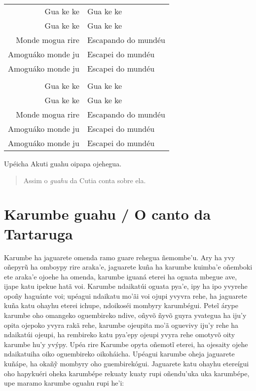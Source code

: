 \begin{itemize}
\begin{table}[]
\begin{tabular}{rl}
Gua ke ke         & Gua ke ke           \\
Gua ke ke         & Gua ke ke           \\
Monde mogua rire  & Escapando do mundéu \\
Amoguáko monde ju & Escapei do mundéu   \\
Amoguáko monde ju & Escapei do mundéu   \\
                  &                     \\
Gua ke ke         & Gua ke ke           \\
Gua ke ke         & Gua ke ke           \\
Monde mogua rire  & Escapando do mundéu \\
Amoguáko monde ju & Escapei do mundéu   \\
Amoguáko monde ju & Escapei do mundéu  
\end{tabular}
\end{table}

Upéicha Akuti guahu oipapa ojehegua.

\begin{quote}
Assim o \emph{guahu} da Cutia conta sobre ela.
\end{quote}

\chapter{Karumbe guahu / O canto da Tartaruga}

Karumbe ha jaguarete omenda ramo guare rehegua ñemombe'u. Ary ha yvy
oñepyrũ ha omboypy rire araka'e, jaguarete kuña ha karumbe kuimba'e
oñemboki ete araka'e ojoehe ha omenda, karumbe iguaná eterei ha oguata
mbegue ave, ijape katu ipekue hatã voi. Karumbe ndaikatúi oguata pya'e,
ipy ha ipo yvyrehe opoñy haguánte voi; upéagui ndaikatu mo'ãi voi ojupi
yvyvra rehe, ha jaguarete kuña katu ohayhu eterei ichupe, ndoikoséi
mombyry karumbégui. Peteĩ árype karumbe oho omangeko oguembireko ndive,
oñyvõ ñyvõ guyra yvategua ha iju'y opita ojepoko yvyra rakã rehe,
karumbe ojeupita mo'ã oguevivy iju'y rehe ha ndaikatúi ojeupi, ha
rembireko katu pya'epy ojeupi yvyra rehe omotyvõ oity karumbe hu'y
yvýpy. Upéa rire Karumbe opyta oñemotĩ eterei, ha ojesaity ojehe
ndaikatuiha oiko oguembireko oikoháicha. Upéagui karumbe oheja jaguarete
kuñápe, ha okañỹ mombyry oho guembirekógui. Jaguarete katu ohayhu
etereígui oho hapykuéri oheka karumbépe rekuaty kuaty rupi oñendu'uka
uka karumbépe, upe maramo karumbe oguahu rupi he'i:


\end{itemize}
